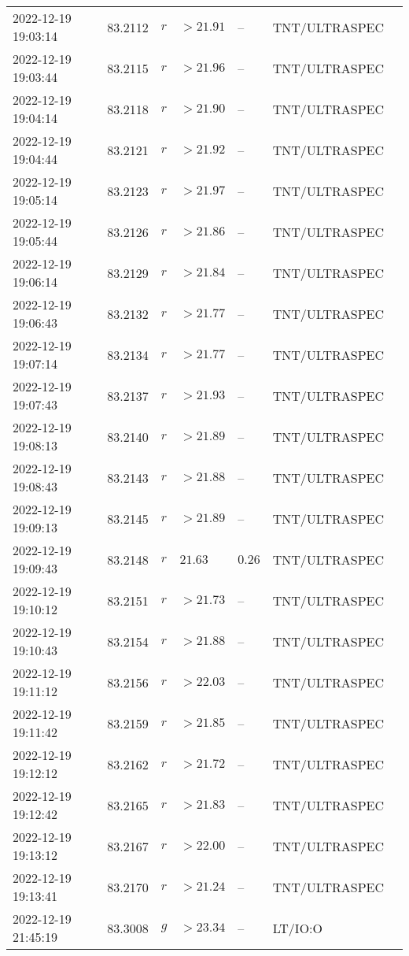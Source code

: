 \documentclass{nature_plusfigure}
\begin{document}
\begin{supplement}
\begin{center}
\begin{longtable}{lllllll}
2022-12-19 19:03:14 & 83.2112 & $r$ & $>21.91$ & -- & TNT/ULTRASPEC &  \\ 
2022-12-19 19:03:44 & 83.2115 & $r$ & $>21.96$ & -- & TNT/ULTRASPEC &  \\ 
2022-12-19 19:04:14 & 83.2118 & $r$ & $>21.90$ & -- & TNT/ULTRASPEC &  \\ 
2022-12-19 19:04:44 & 83.2121 & $r$ & $>21.92$ & -- & TNT/ULTRASPEC &  \\ 
2022-12-19 19:05:14 & 83.2123 & $r$ & $>21.97$ & -- & TNT/ULTRASPEC &  \\ 
2022-12-19 19:05:44 & 83.2126 & $r$ & $>21.86$ & -- & TNT/ULTRASPEC &  \\ 
2022-12-19 19:06:14 & 83.2129 & $r$ & $>21.84$ & -- & TNT/ULTRASPEC &  \\ 
2022-12-19 19:06:43 & 83.2132 & $r$ & $>21.77$ & -- & TNT/ULTRASPEC &  \\ 
2022-12-19 19:07:14 & 83.2134 & $r$ & $>21.77$ & -- & TNT/ULTRASPEC &  \\ 
2022-12-19 19:07:43 & 83.2137 & $r$ & $>21.93$ & -- & TNT/ULTRASPEC &  \\ 
2022-12-19 19:08:13 & 83.2140 & $r$ & $>21.89$ & -- & TNT/ULTRASPEC &  \\ 
2022-12-19 19:08:43 & 83.2143 & $r$ & $>21.88$ & -- & TNT/ULTRASPEC &  \\ 
2022-12-19 19:09:13 & 83.2145 & $r$ & $>21.89$ & -- & TNT/ULTRASPEC &  \\ 
2022-12-19 19:09:43 & 83.2148 & $r$ & $21.63$ & $0.26$ & TNT/ULTRASPEC &  \\ 
2022-12-19 19:10:12 & 83.2151 & $r$ & $>21.73$ & -- & TNT/ULTRASPEC &  \\ 
2022-12-19 19:10:43 & 83.2154 & $r$ & $>21.88$ & -- & TNT/ULTRASPEC &  \\ 
2022-12-19 19:11:12 & 83.2156 & $r$ & $>22.03$ & -- & TNT/ULTRASPEC &  \\ 
2022-12-19 19:11:42 & 83.2159 & $r$ & $>21.85$ & -- & TNT/ULTRASPEC &  \\ 
2022-12-19 19:12:12 & 83.2162 & $r$ & $>21.72$ & -- & TNT/ULTRASPEC &  \\ 
2022-12-19 19:12:42 & 83.2165 & $r$ & $>21.83$ & -- & TNT/ULTRASPEC &  \\ 
2022-12-19 19:13:12 & 83.2167 & $r$ & $>22.00$ & -- & TNT/ULTRASPEC &  \\ 
2022-12-19 19:13:41 & 83.2170 & $r$ & $>21.24$ & -- & TNT/ULTRASPEC &  \\ 
2022-12-19 21:45:19 & 83.3008 & $g$ & $>23.34$ & -- & LT/IO:O &  \\ 

\end{longtable}
\end{center}
\end{supplement}
\end{document}

